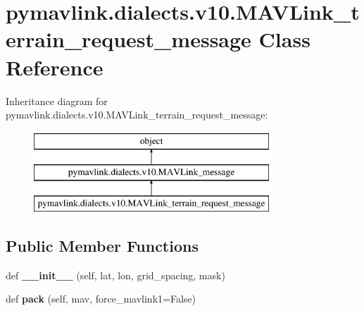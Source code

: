 \hypertarget{classpymavlink_1_1dialects_1_1v10_1_1MAVLink__terrain__request__message}{}\section{pymavlink.\+dialects.\+v10.\+M\+A\+V\+Link\+\_\+terrain\+\_\+request\+\_\+message Class Reference}
\label{classpymavlink_1_1dialects_1_1v10_1_1MAVLink__terrain__request__message}
Inheritance diagram for pymavlink.\+dialects.\+v10.\+M\+A\+V\+Link\+\_\+terrain\+\_\+request\+\_\+message\+:\begin{figure}[H]
\begin{center}
\leavevmode
\includegraphics[height=3.000000cm]{classpymavlink_1_1dialects_1_1v10_1_1MAVLink__terrain__request__message}
\end{center}
\end{figure}
\subsection*{Public Member Functions}
\begin{DoxyCompactItemize}
\item 
\mbox{\label{classpymavlink_1_1dialects_1_1v10_1_1MAVLink__terrain__request__message_a114219473eff7b22eef3ff75fae994b3}} 
def {\bfseries \+\_\+\+\_\+init\+\_\+\+\_\+} (self, lat, lon, grid\+\_\+spacing, mask)
\item 
\mbox{\label{classpymavlink_1_1dialects_1_1v10_1_1MAVLink__terrain__request__message_ae1d9fd8f7a829f13b6cd3bb7ef0719f0}} 
def {\bfseries pack} (self, mav, force\+\_\+mavlink1=False)
\end{DoxyCompactItemize}
